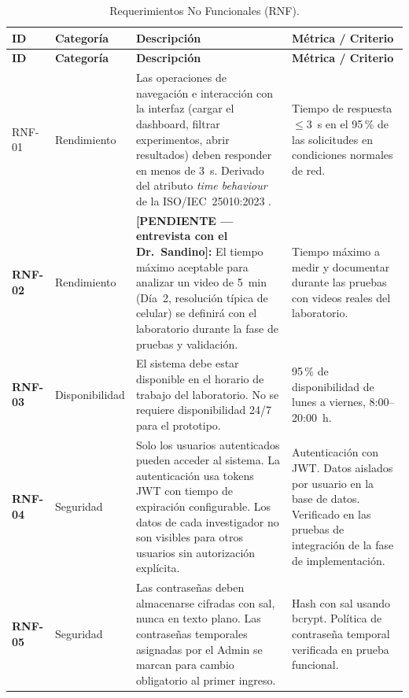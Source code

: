 \begin{longtable}{|>{\bfseries}p{1.1cm}|p{1.8cm}|p{5.9cm}|p{4.3cm}|}
\caption{Requerimientos No Funcionales (RNF).
\label{tab:rnf}}\\
\hline
\textbf{ID} & \textbf{Categoría} & \textbf{Descripción} & \textbf{Métrica / Criterio} \\
\hline
\endfirsthead
\hline
\textbf{ID} & \textbf{Categoría} & \textbf{Descripción} & \textbf{Métrica / Criterio} \\
\hline
\endhead
\hline
\endfoot

RNF-01 & Rendimiento
       & Las operaciones de navegación e interacción con la interfaz (cargar el
         dashboard, filtrar experimentos, abrir resultados) deben responder en menos
         de 3~s. Derivado del atributo \textit{time behaviour} de la ISO/IEC~25010:2023
         \cite{iso25010}.
       & Tiempo de respuesta $\leq 3$~s en el 95\,\% de las solicitudes en condiciones
         normales de red. \\
\hline
RNF-02 & Rendimiento
       & \textbf{[PENDIENTE — entrevista con el Dr.\ Sandino]:} El tiempo máximo
         aceptable para analizar un video de 5~min (Día~2, resolución típica de celular)
         se definirá con el laboratorio durante la fase de pruebas y validación.
       & Tiempo máximo a medir y documentar durante las pruebas con videos reales
         del laboratorio. \\
\hline
RNF-03 & Disponibilidad
       & El sistema debe estar disponible en el horario de trabajo del laboratorio.
         No se requiere disponibilidad 24/7 para el prototipo.
       & 95\,\% de disponibilidad de lunes a viernes, 8:00--20:00~h. \\
\hline
RNF-04 & Seguridad
       & Solo los usuarios autenticados pueden acceder al sistema. La autenticación
         usa tokens JWT con tiempo de expiración configurable. Los datos de cada
         investigador no son visibles para otros usuarios sin autorización explícita.
       & Autenticación con JWT. Datos aislados por usuario en la base de datos.
         Verificado en las pruebas de integración de la fase de implementación. \\
\hline
RNF-05 & Seguridad
       & Las contraseñas deben almacenarse cifradas con sal, nunca en texto plano.
         Las contraseñas temporales asignadas por el Admin se marcan para cambio
         obligatorio al primer ingreso.
       & Hash con sal usando bcrypt. Política de contraseña temporal verificada
         en prueba funcional. \\

\end{longtable}
